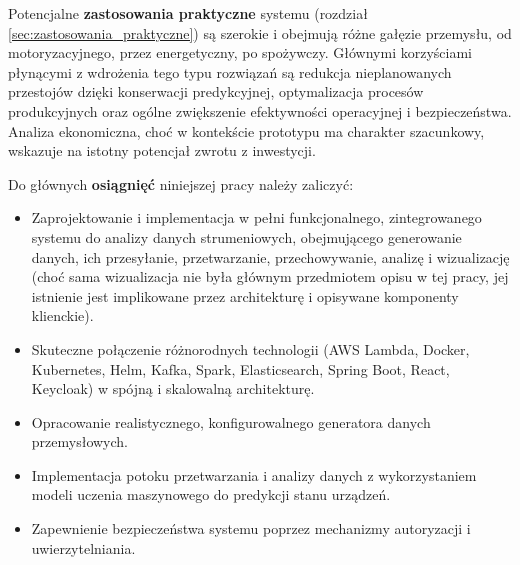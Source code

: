 Potencjalne \textbf{zastosowania praktyczne} systemu (rozdział \ref{sec:zastosowania_praktyczne}) są szerokie i obejmują różne gałęzie przemysłu, od motoryzacyjnego, przez energetyczny, po spożywczy. Głównymi korzyściami płynącymi z wdrożenia tego typu rozwiązań są redukcja nieplanowanych przestojów dzięki konserwacji predykcyjnej, optymalizacja procesów produkcyjnych oraz ogólne zwiększenie efektywności operacyjnej i bezpieczeństwa. Analiza ekonomiczna, choć w kontekście prototypu ma charakter szacunkowy, wskazuje na istotny potencjał zwrotu z inwestycji.

Do głównych \textbf{osiągnięć} niniejszej pracy należy zaliczyć:
\begin{itemize}
    \item Zaprojektowanie i implementacja w pełni funkcjonalnego, zintegrowanego systemu do analizy danych  strumeniowych, obejmującego generowanie danych, ich przesyłanie, przetwarzanie, przechowywanie, analizę i wizualizację (choć sama wizualizacja nie była głównym przedmiotem opisu w tej pracy, jej istnienie jest implikowane przez architekturę i opisywane komponenty klienckie).
    \item Skuteczne połączenie różnorodnych technologii (AWS Lambda, Docker, Kubernetes, Helm, Kafka, Spark, Elasticsearch, Spring Boot, React, Keycloak) w spójną i skalowalną architekturę.
    \item Opracowanie realistycznego, konfigurowalnego generatora danych przemysłowych.
    \item Implementacja potoku przetwarzania i analizy danych z wykorzystaniem modeli uczenia maszynowego do predykcji stanu urządzeń.
    \item Zapewnienie bezpieczeństwa systemu poprzez mechanizmy autoryzacji i uwierzytelniania.
\end{itemize}

